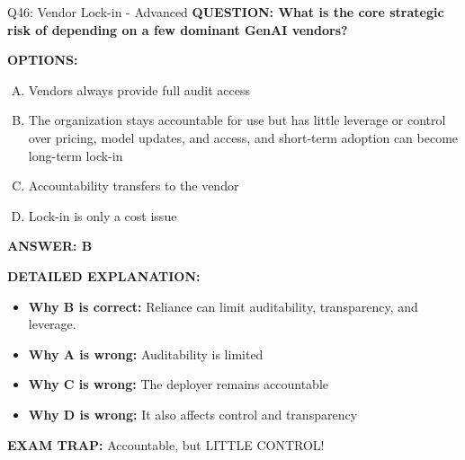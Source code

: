 \documentclass[8pt]{beamer}
\begin{document}
\begin{frame}[shrink=6]{Q46: Vendor Lock-in - Advanced}
\fontsize{6.5}{7.5}\selectfont
\textbf{QUESTION: What is the core strategic risk of depending on a few dominant GenAI vendors?}

\vspace{0.1cm}
\textbf{OPTIONS:}
\begin{enumerate}[A.]
\item Vendors always provide full audit access
\item The organization stays accountable for use but has little leverage or control over pricing, model updates, and access, and short-term adoption can become long-term lock-in
\item Accountability transfers to the vendor
\item Lock-in is only a cost issue
\end{enumerate}

\vspace{0.1cm}
\textcolor{myblue}{\textbf{ANSWER: B}}

\vspace{0.1cm}
\textbf{DETAILED EXPLANATION:}
\begin{itemize}
\item \textbf{Why B is correct:} Reliance can limit auditability, transparency, and leverage.
\item \textbf{Why A is wrong:} Auditability is limited
\item \textbf{Why C is wrong:} The deployer remains accountable
\item \textbf{Why D is wrong:} It also affects control and transparency
\end{itemize}

\textcolor{myred}{\textbf{EXAM TRAP:}} Accountable, but LITTLE CONTROL!
\end{frame}
\end{document}

